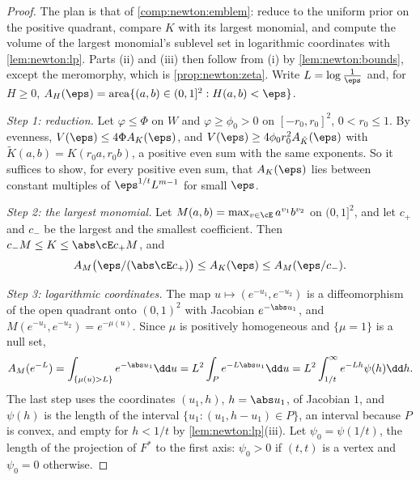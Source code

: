 \begin{refsection}
\begin{proof}
The plan is that of \cref{comp:newton:emblem}: reduce to the uniform prior on the positive quadrant, compare $K$ with its largest monomial, and compute the volume of the largest monomial's sublevel set in logarithmic coordinates with \cref{lem:newton:lp}. Parts (ii) and (iii) then follow from (i) by \cref{lem:newton:bounds}, except the meromorphy, which is \cref{prop:newton:zeta}. Write $L=\log\frac1\eps$ and, for $H\ge0$, $A_H(\eps)=\mathrm{area}\{(a,b)\in(0,1]^2:H(a,b)<\eps\}$.

\emph{Step 1: reduction.} Let $\varphi\le\Phi$ on $W$ and $\varphi\ge\phi_0>0$ on $[-r_0,r_0]^2$, $0<r_0\le1$. By evenness, $V(\eps)\le4\Phi A_K(\eps)$, and $V(\eps)\ge4\phi_0r_0^2A_{\tilde K}(\eps)$ with $\tilde K(a,b)=K(r_0a,r_0b)$, a positive even sum with the same exponents. So it suffices to show, for every positive even sum, that $A_K(\eps)$ lies between constant multiples of $\eps^{1/t}L^{m-1}$ for small $\eps$.

\emph{Step 2: the largest monomial.} Let $M(a,b)=\max_{v\in\cE}a^{v_1}b^{v_2}$ on $(0,1]^2$, and let $c_+$ and $c_-$ be the largest and the smallest coefficient. Then $c_-M\le K\le\abs\cE c_+M$, and
\begin{equation}\label{eq:newton:sandwich}
A_M\bigl(\eps/(\abs\cE c_+)\bigr)\le A_K(\eps)\le A_M(\eps/c_-).
\end{equation}

\emph{Step 3: logarithmic coordinates.} The map $u\mapsto(e^{-u_1},e^{-u_2})$ is a diffeomorphism of the open quadrant onto $(0,1)^2$ with Jacobian $e^{-\abs u_1}$, and $M(e^{-u_1},e^{-u_2})=e^{-\mu(u)}$. Since $\mu$ is positively homogeneous and $\{\mu=1\}$ is a null set,
\[
A_M(e^{-L})=\int_{\{\mu(u)>L\}}e^{-\abs u_1}\dd u=L^2\int_Pe^{-L\abs u_1}\dd u=L^2\int_{1/t}^\infty e^{-Lh}\psi(h)\dd h.
\]
The last step uses the coordinates $(u_1,h)$, $h=\abs u_1$, of Jacobian $1$, and $\psi(h)$ is the length of the interval $\{u_1:(u_1,h-u_1)\in P\}$, an interval because $P$ is convex, and empty for $h<1/t$ by \cref{lem:newton:lp}(iii). Let $\psi_0=\psi(1/t)$, the length of the projection of $F^*$ to the first axis: $\psi_0>0$ if $(t,t)$ is a vertex and $\psi_0=0$ otherwise.


\end{proof}
\end{refsection}
